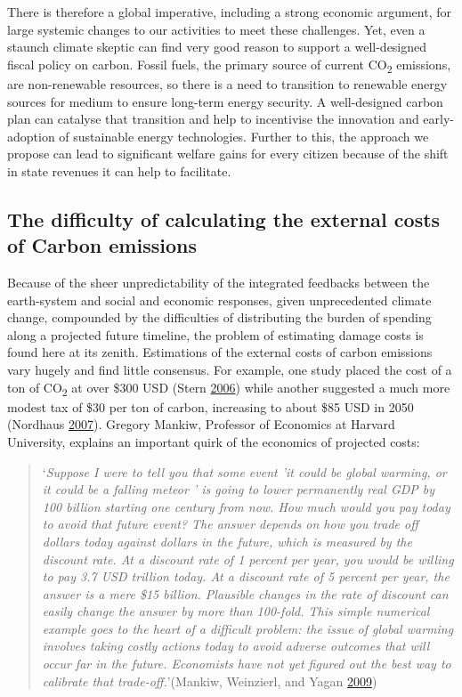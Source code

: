 \documentclass[]{tufte-handout}
\begin{document}
There is therefore a global imperative, including a strong economic
argument, for large systemic changes to our activities to meet these
challenges. Yet, even a staunch climate skeptic can find very good
reason to support a well-designed fiscal policy on carbon. Fossil fuels,
the primary source of current CO\textsubscript{2} emissions, are
non-renewable resources, so there is a need to transition to renewable
energy sources for medium to ensure long-term energy security. A
well-designed carbon plan can catalyse that transition and help to
incentivise the innovation and early-adoption of sustainable energy
technologies. Further to this, the approach we propose can lead to
significant welfare gains for every citizen because of the shift in
state revenues it can help to facilitate.

\hypertarget{the-difficulty-of-calculating-the-external-costs-of-carbon-emissions}{%
\subsection{The difficulty of calculating the external costs of Carbon
emissions}\label{the-difficulty-of-calculating-the-external-costs-of-carbon-emissions}}

Because of the sheer unpredictability of the integrated feedbacks
between the earth-system and social and economic responses, given
unprecedented climate change, compounded by the difficulties of
distributing the burden of spending along a projected future timeline,
the problem of estimating damage costs is found here at its zenith.
Estimations of the external costs of carbon emissions vary hugely and
find little consensus. For example, one study placed the cost of a ton
of CO\textsubscript{2} at over \$300 USD (Stern
\protect\hyperlink{ref-Stern2006a}{2006}) while another suggested a much
more modest tax of \$30 per ton of carbon, increasing to about \$85 USD
in 2050 (Nordhaus \protect\hyperlink{ref-Nordhaus2007}{2007}). Gregory
Mankiw, Professor of Economics at Harvard University, explains an
important quirk of the economics of projected costs:

\begin{quote}
`\emph{Suppose I were to tell you that some event 'it could be global
warming, or it could be a falling meteor ' is going to lower permanently
real GDP by 100 billion starting one century from now. How much would
you pay today to avoid that future event? The answer depends on how you
trade off dollars today against dollars in the future, which is measured
by the discount rate. At a discount rate of 1 percent per year, you
would be willing to pay 3.7 USD trillion today. At a discount rate of 5
percent per year, the answer is a mere \$15 billion. Plausible changes
in the rate of discount can easily change the answer by more than
100-fold. This simple numerical example goes to the heart of a difficult
problem: the issue of global warming involves taking costly actions
today to avoid adverse outcomes that will occur far in the future.
Economists have not yet figured out the best way to calibrate that
trade-off.}'(Mankiw, Weinzierl, and Yagan
\protect\hyperlink{ref-Mankiw2009}{2009})
\end{quote}
\end{document}
